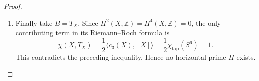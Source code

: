 \begin{proof}
\begin{enumerate}[label={$\langle1\rangle$\arabic*.},leftmargin=*]
\item Finally take $B=T_X$.  Since $H^2(X,\mathbb Z)=H^4(X,\mathbb Z)=0$,
the only contributing term in its Riemann--Roch formula is
\[
 \chi(X,T_X)=\frac12\langle c_3(X),[X]\rangle
            =\frac12\chi_{\mathrm{top}}(S^6)=1.
\]
This contradicts the preceding inequality.  Hence no
horizontal prime $H$ exists.

\end{enumerate}
\end{proof}
